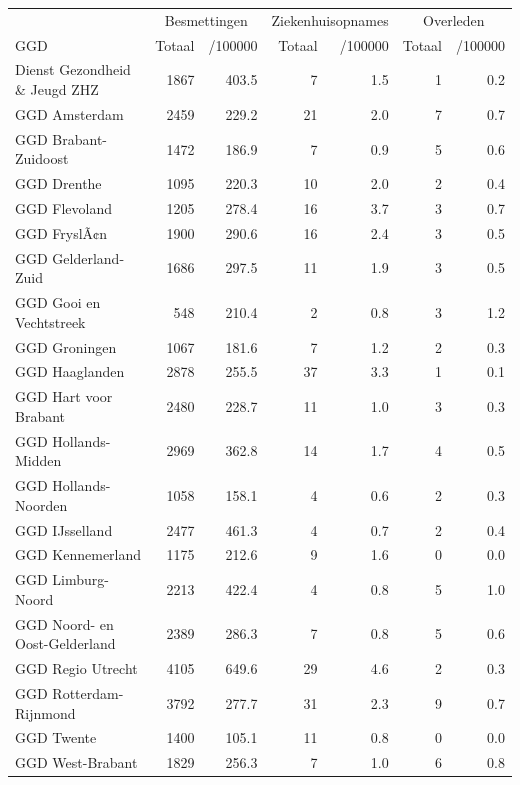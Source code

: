 \documentclass[
  english,
  man,floatsintext]{apa6}
\begin{document}
\begin{table}
\centering\begingroup\fontsize{10}{12}\selectfont

\begin{threeparttable}
\begin{tabular}{lrrrrrr}
\toprule
\multicolumn{1}{c}{ } & \multicolumn{2}{c}{Besmettingen} & \multicolumn{2}{c}{Ziekenhuisopnames} & \multicolumn{2}{c}{Overleden} \\
\cmidrule(l{3pt}r{3pt}){2-3} \cmidrule(l{3pt}r{3pt}){4-5} \cmidrule(l{3pt}r{3pt}){6-7}
GGD & Totaal & /100000 & Totaal & /100000 & Totaal & /100000\\
\midrule
Dienst Gezondheid \& Jeugd ZHZ & 1867 & 403.5 & 7 & 1.5 & 1 & 0.2\\
GGD Amsterdam & 2459 & 229.2 & 21 & 2.0 & 7 & 0.7\\
GGD Brabant-Zuidoost & 1472 & 186.9 & 7 & 0.9 & 5 & 0.6\\
GGD Drenthe & 1095 & 220.3 & 10 & 2.0 & 2 & 0.4\\
GGD Flevoland & 1205 & 278.4 & 16 & 3.7 & 3 & 0.7\\
GGD FryslÃ¢n & 1900 & 290.6 & 16 & 2.4 & 3 & 0.5\\
GGD Gelderland-Zuid & 1686 & 297.5 & 11 & 1.9 & 3 & 0.5\\
GGD Gooi en Vechtstreek & 548 & 210.4 & 2 & 0.8 & 3 & 1.2\\
GGD Groningen & 1067 & 181.6 & 7 & 1.2 & 2 & 0.3\\
GGD Haaglanden & 2878 & 255.5 & 37 & 3.3 & 1 & 0.1\\
GGD Hart voor Brabant & 2480 & 228.7 & 11 & 1.0 & 3 & 0.3\\
GGD Hollands-Midden & 2969 & 362.8 & 14 & 1.7 & 4 & 0.5\\
GGD Hollands-Noorden & 1058 & 158.1 & 4 & 0.6 & 2 & 0.3\\
GGD IJsselland & 2477 & 461.3 & 4 & 0.7 & 2 & 0.4\\
GGD Kennemerland & 1175 & 212.6 & 9 & 1.6 & 0 & 0.0\\
GGD Limburg-Noord & 2213 & 422.4 & 4 & 0.8 & 5 & 1.0\\
GGD Noord- en Oost-Gelderland & 2389 & 286.3 & 7 & 0.8 & 5 & 0.6\\
GGD Regio Utrecht & 4105 & 649.6 & 29 & 4.6 & 2 & 0.3\\
GGD Rotterdam-Rijnmond & 3792 & 277.7 & 31 & 2.3 & 9 & 0.7\\
GGD Twente & 1400 & 105.1 & 11 & 0.8 & 0 & 0.0\\
GGD West-Brabant & 1829 & 256.3 & 7 & 1.0 & 6 & 0.8\\

\end{tabular}
\end{threeparttable}
\end{table}
\end{document}
